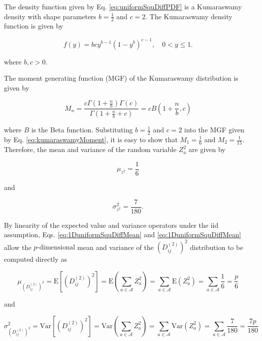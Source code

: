 \documentclass[10pt,letterpaper]{article}\usepackage[]{graphicx}\usepackage[]{color}
\begin{document}
The density function given by Eq. \ref{eq:uniformSquDiffPDF} is a Kumaraswamy density with shape parameters $b=\frac{1}{2}$ and $c=2$. The Kumaraswamy density function is given by

\begin{equation}\label{eq:kumaraswamy}
f(y) = b c y^{b - 1} (1 - y^b)^{c-1}, \quad 0 < y \leq 1.
\end{equation}

\noindent where $b,c>0$.

The moment generating function (MGF) of the Kumaraswamy distribution is given by

\begin{equation}\label{eq:kumaraswamyMoment}
M_n = \frac{c \Gamma\left(1 + \frac{n}{b}\right) \Gamma(c)}{\Gamma\left(1 + \frac{n}{b} + c\right)} = c B\left(1 + \frac{n}{b},c\right)
\end{equation}

\noindent where $B$ is the Beta function. Substituting $b=\frac{1}{2}$ and $c=2$ into the MGF given by Eq. \ref{eq:kumaraswamyMoment}, it is easy to show that $M_1 = \frac{1}{6}$ and $M_2 = \frac{1}{15}$. Therefore, the mean and variance of the random variable $Z^2_a$ are given by

\begin{equation}\label{eq:1DuniformSquDiffMean}
\mu_{z^2} = \frac{1}{6}
\end{equation}

\noindent and

\begin{equation}\label{eq:1DuniformSquDiffVar}
\sigma^2_{z^2} = \frac{7}{180}.
\end{equation}

By linearity of the expected value and variance operators under the iid assumption, Eqs. \ref{eq:1DuniformSquDiffMean} and \ref{eq:1DuniformSquDiffMean} allow the $p \text{-dimensional}$ mean and variance of the $\left(D^{(2)}_{ij}\right)^2$ distribution to be computed directly as

\begin{equation}\label{eq:uniformSquDiffMean}
\mu_{\left(D^{(2)}_{ij}\right)^2} = \text{E}\left[\left(D^{(2)}_{ij}\right)^2\right] = \text{E}\left(\sum_{a \in \mathcal{A}} Z^2_a\right) = \sum_{a \in \mathcal{A}} \text{E}\left(Z^2_a\right) = \sum_{a \in \mathcal{A}} \frac{1}{6} = \frac{p}{6}
\end{equation}

\noindent and

\begin{equation}\label{eq:uniformSquDiffVar}
\sigma^2_{\left(D^{(2)}_{ij}\right)^2} = \text{Var}\left[\left(D^{(2)}_{ij}\right)^2\right] = \text{Var}\left(\sum_{a \in \mathcal{A}} Z^2_a\right) = \sum_{a \in \mathcal{A}} \text{Var}\left(Z^2_a\right) = \sum_{a \in \mathcal{A}} \frac{7}{180} = \frac{7p}{180}
\end{equation}
\end{document}
